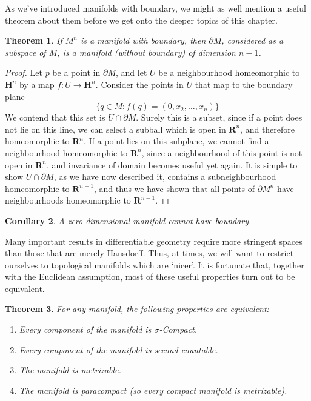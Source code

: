 \documentclass[12pt]{report}
\theoremstyle{plain}
\newtheorem{theorem}{Theorem}[chapter]
\newtheorem{corollary}[theorem]{Corollary}
\theoremstyle{definition}
\begin{document}
As we've introduced manifolds with boundary, we might as well mention a useful theorem about them before we get onto the deeper topics of this chapter.

\begin{theorem}
    If $M^n$ is a manifold with boundary, then $\partial M$, considered as a subspace of $M$, is a manifold (without boundary) of dimension $n-1$.
\end{theorem}
\begin{proof}
    Let $p$ be a point in $\partial M$, and let $U$ be a neighbourhood homeomorphic to $\mathbf{H}^n$ by a map $f:U \to \mathbf{H}^n$. Consider the points in $U$ that map to the boundary plane
    \[ \{ q \in M : f(q) = (0,x_2, \dots, x_n) \} \]
    We contend that this set is $U \cap \partial M$. Surely this is a subset, since if a point does not lie on this line, we can select a subball which is open in $\mathbf{R}^n$, and therefore homeomorphic to $\mathbf{R}^n$. If a point lies on this subplane, we cannot find a neighbourhood homeomorphic to $\mathbf{R}^n$, since a neighbourhood of this point is not open in $\mathbf{R}^n$, and invariance of domain becomes useful yet again. It is simple to show $U \cap \partial M$, as we have now described it, contains a subneighbourhood homeomorphic to $\mathbf{R}^{n-1}$, and thus we have shown that all points of $\partial M^n$ have neighbourhoods homeomorphic to $\mathbf{R}^{n-1}$.
\end{proof}

\begin{corollary} A zero dimensional manifold cannot have boundary. \end{corollary}

Many important results in differentiable geometry require more stringent spaces than those that are merely Hausdorff. Thus, at times, we will want to restrict ourselves to topological manifolds which are `nicer'. It is fortunate that, together with the Euclidean assumption, most of these useful properties turn out to be equivalent.

\begin{theorem}
    For any manifold, the following properties are equivalent:
    \begin{enumerate}
        \item Every component of the manifold is $\sigma$-Compact.
        \item Every component of the manifold is second countable.
        \item The manifold is metrizable.
        \item The manifold is paracompact (so every compact manifold is metrizable).
    \end{enumerate}
\end{theorem}
\end{document}

